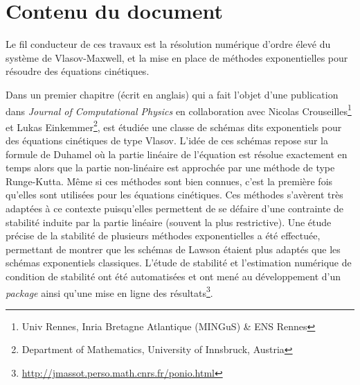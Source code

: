 
\section{Contenu du document}

Le fil conducteur de ces travaux est la résolution numérique d'ordre élevé du système de Vlasov-Maxwell, et la mise en place de méthodes exponentielles pour résoudre des équations cinétiques.

Dans un premier chapitre (écrit en anglais) qui a fait l'objet d'une publication dans \emph{Journal of Computational Physics} en collaboration avec Nicolas Crouseilles\footnote{Univ Rennes, Inria Bretagne Atlantique (MINGuS) \& ENS Rennes} et Lukas Einkemmer\footnote{Department of Mathematics, University of Innsbruck, Austria}, est étudiée une classe de schémas dits exponentiels pour des équations cinétiques de type Vlasov. L'idée de ces schémas repose sur la formule de Duhamel où la partie linéaire de l'équation est résolue exactement en temps alors que la partie non-linéaire est approchée par une méthode de type Runge-Kutta. Même si ces méthodes sont bien connues, c'est la première fois qu'elles sont utilisées pour les équations cinétiques. Ces méthodes s'avèrent très adaptées à ce contexte puisqu'elles permettent de se défaire d'une contrainte de stabilité induite par la partie linéaire (souvent la plus restrictive). Une étude précise de la stabilité de plusieurs méthodes exponentielles a été effectuée, permettant de montrer que les schémas de Lawson étaient plus adaptés que les schémas exponentiels classiques. L'étude de stabilité et l'estimation numérique de condition de stabilité ont été automatisées et ont mené au développement d'un \emph{package} \Python{} ainsi qu'une mise en ligne des résultats\footnote{\url{http://jmassot.perso.math.cnrs.fr/ponio.html}}.

